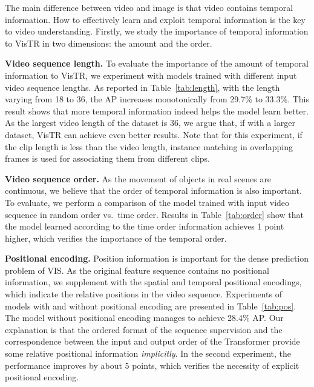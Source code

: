 \documentclass[final]{cvpr}
\def\Ours{{VisTR}\xspace}
\newcommand{\myparagraph}[1]{{\vspace{0.01cm} \noindent \bf #1}}
\begin{document}
{The main difference between video and image is that video contains  temporal information.
How to effectively learn and exploit temporal information is the key to video understanding.
Firstly, we study the importance of temporal information to \Ours in two dimensions: the amount and the order. 

\myparagraph{Video sequence length.}
To evaluate the importance of the amount of temporal information to \Ours, we experiment with models trained with different input video sequence lengths. As reported in Table~\ref{tab:length}, with the length varying 
from 18 to 36, the AP increases monotonically from 29.7\%  to 33.3\%. This result shows that more temporal information indeed helps the model learn better. As the largest video length of the dataset is 36, we argue that, if with a larger dataset, \Ours can achieve even better results.
Note that for this experiment, if the clip length is less than the video length, instance matching in overlapping frames is used for associating them from different clips. 


\myparagraph{Video sequence order.}
As the movement of objects in real scenes 
are continuous, we believe 
that the order of temporal information is also important. To evaluate, we perform a comparison of the model trained with input video sequence in random order vs.\  time order. Results in Table~\ref{tab:order} show that the model learned according to the
time order information achieves 1 point higher, which verifies the importance of the temporal order.



\myparagraph{Positional encoding.}
Position information is important for the dense prediction problem of VIS. As the original feature sequence contains no positional information, we supplement with the spatial and temporal positional encodings,
which indicate the relative positions in the video sequence. Experiments of models with and without positional encoding are presented 
in Table~\ref{tab:pos}. The model without positional encoding manages to 
achieve 28.4\% AP.
Our explanation is that the ordered format of the sequence supervision and the correspondence between the input and output order of the Transformer provide some relative positional information \textit{implicitly}. In the second experiment, the performance improves by about 5 points, which verifies the necessity of explicit positional encoding.

}
\end{document}
